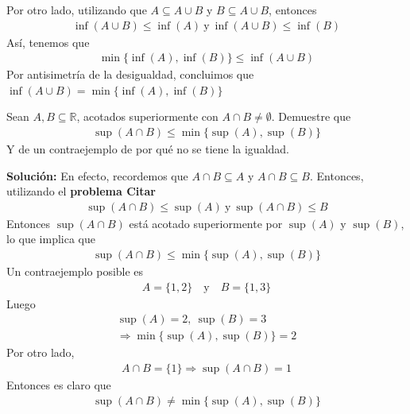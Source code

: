\documentclass[12pt]{book}
\begin{document}
\begin{itemize}
Por otro lado, utilizando que  $A \subseteq A  \cup B$ y $B \subseteq A\cup B$, entonces 
\begin{align*}
    \inf(A \cup B) \leq \inf(A) \ \text{y} \ \inf(A\cup B) \leq \inf(B)
\end{align*}
Así, tenemos que 
\begin{align*}
    \min\{\inf(A),\inf(B)\} \leq \inf(A\cup B)
\end{align*}
Por antisimetría de la desigualdad, concluimos que $\inf(A\cup B)=\min\{\inf(A),\inf(B)\}$
\end{itemize}
\begin{prob}{}{}
    Sean $A,B \subseteq \mathbb{R}$, acotados superiormente con $A \cap B \neq \emptyset$. Demuestre que 
    \begin{align*}
        \sup(A \cap B) \leq \min\{\sup(A), \sup (B)\}
    \end{align*}
    Y de un contraejemplo de por qué no se tiene la igualdad.
\end{prob}
\textbf{Solución:} En efecto, recordemos que $A \cap B \subseteq A$ y $A \cap B \subseteq B$. Entonces, utilizando el \textbf{problema Citar}
\begin{align*}
    \sup(A\cap B) \leq \sup(A) \ \text{y}\ \sup(A\cap B) \leq B
\end{align*}
Entonces $\sup(A \cap B)$ está acotado superiormente por $\sup(A)$ y $\sup(B)$, lo que implica que 
\begin{align*}
    \sup(A \cap B) \leq \min\{ \sup(A),\sup(B)\}
\end{align*}
Un contraejemplo posible es 
\begin{align*}
    A= \{1,2\} \quad \text{y} \quad B =\{1,3\} 
\end{align*}
Luego
\begin{align*}
    \sup(A)=2, \ \sup(B)=3 \\
    \Longrightarrow \min\{\sup(A),\sup(B)\}=2
\end{align*}
Por otro lado,
\begin{align*}
    A\cap B= \{1\} \Longrightarrow \sup(A\cap B) =1
\end{align*}
Entonces es claro que 
\begin{align*}
    \sup(A\cap B) \neq \min\{\sup(A),\sup(B)\}
\end{align*}
\end{document}
